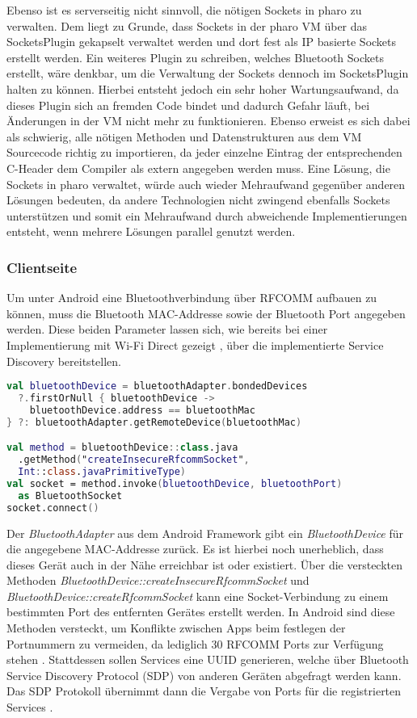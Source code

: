         Ebenso ist es serverseitig nicht sinnvoll, die nötigen Sockets in pharo zu verwalten. Dem liegt zu Grunde, dass Sockets in der pharo VM über das SocketsPlugin \cite{pharoSocket} gekapselt verwaltet werden und dort fest als IP basierte Sockets erstellt werden. Ein weiteres Plugin zu schreiben, welches Bluetooth Sockets erstellt, wäre denkbar, um die Verwaltung der Sockets dennoch im SocketsPlugin halten zu können. Hierbei entsteht jedoch ein sehr hoher Wartungsaufwand, da dieses Plugin sich an fremden Code bindet und dadurch Gefahr läuft, bei Änderungen in der VM nicht mehr zu funktionieren. Ebenso erweist es sich dabei als schwierig, alle nötigen Methoden und Datenstrukturen aus dem VM Sourcecode richtig zu importieren, da jeder einzelne Eintrag der entsprechenden C-Header dem Compiler als extern angegeben werden muss.
        Eine Lösung, die Sockets in pharo verwaltet, würde auch wieder Mehraufwand gegenüber anderen Lösungen bedeuten, da andere Technologien nicht zwingend ebenfalls Sockets unterstützen und somit ein Mehraufwand durch abweichende Implementierungen entsteht, wenn mehrere Lösungen parallel genutzt werden.
        
        \subsubsection{Clientseite}
        Um unter Android eine Bluetoothverbindung über RFCOMM aufbauen zu können, muss die Bluetooth MAC-Addresse sowie der Bluetooth Port angegeben werden. Diese beiden Parameter lassen sich, wie bereits bei einer Implementierung mit Wi-Fi Direct gezeigt \cite{aiProject}, über die implementierte Service Discovery bereitstellen.
        \begin{lstlisting}[frame=bt, label={lst:android:bluetooth}, language=Kotlin, caption=Verbindungsaufbau mit Bluetooth (Clientcode in Kotlin)]
val bluetoothDevice = bluetoothAdapter.bondedDevices
  ?.firstOrNull { bluetoothDevice ->
    bluetoothDevice.address == bluetoothMac
} ?: bluetoothAdapter.getRemoteDevice(bluetoothMac)

val method = bluetoothDevice::class.java
  .getMethod("createInsecureRfcommSocket",
  Int::class.javaPrimitiveType)
val socket = method.invoke(bluetoothDevice, bluetoothPort)
  as BluetoothSocket
socket.connect()
        \end{lstlisting}
        Der {\it BluetoothAdapter} aus dem Android Framework gibt ein {\it BluetoothDevice} für die angegebene MAC-Addresse zurück. Es ist hierbei noch unerheblich, dass dieses Gerät auch in der Nähe erreichbar ist oder existiert. Über die versteckten Methoden {\it BluetoothDevice::createInsecureRfcommSocket} und {\it BluetoothDevice::createRfcommSocket} kann eine Socket-Verbindung zu einem bestimmten Port des entfernten Gerätes erstellt werden. In Android sind diese Methoden versteckt, um Konflikte zwischen Apps beim festlegen der Portnummern zu vermeiden, da lediglich 30 RFCOMM Ports zur Verfügung stehen \cite{bluezRfComm}. Stattdessen sollen Services eine UUID generieren, welche über Bluetooth Service Discovery Protocol (SDP) von anderen Geräten abgefragt werden kann. Das SDP Protokoll übernimmt dann die Vergabe von Ports für die registrierten Services \cite{androidBluetooth}.
        
